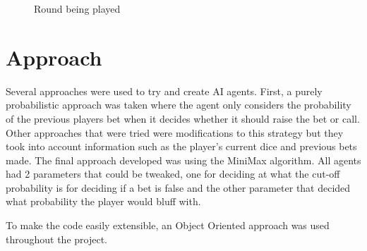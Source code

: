 \begin{figure}[htbp]
    \centering
    \caption{Round being played}
    \label{fig:round}
\end{figure}


\section{Approach}

Several approaches were used to try and create AI agents. First, a purely probabilistic approach was taken where the agent only considers the probability of the previous players bet when it decides whether it should raise the bet or call. Other approaches that were tried were modifications to this strategy but they took into account information such as the player's current dice and previous bets made. The final approach developed was using the MiniMax algorithm. All agents had 2 parameters that could be tweaked, one for deciding at what the cut-off probability is for deciding if a bet is false and the other parameter that decided what probability the player would bluff with.


To make the code easily extensible, an Object Oriented approach was used throughout the project.


